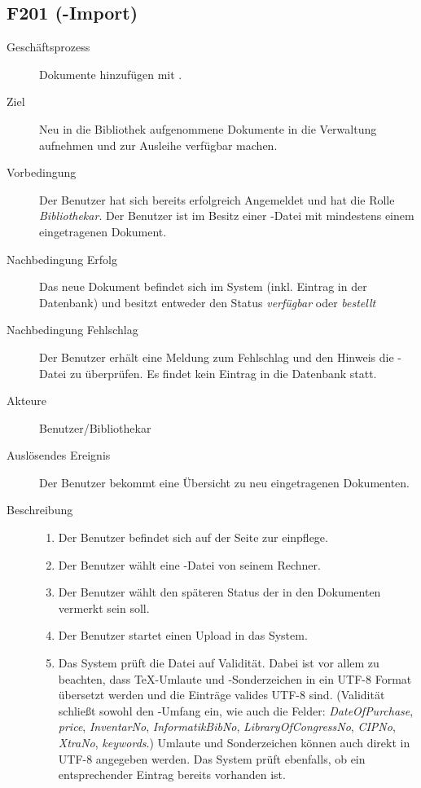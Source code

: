 \subsection{F201 (\BibTeX-Import)}
\begin{description}
  \item[Geschäftsprozess]Dokumente hinzufügen mit \BibTeX.
  \item[Ziel]Neu in die Bibliothek aufgenommene Dokumente in die Verwaltung aufnehmen und zur Ausleihe verfügbar machen.
  \item[Vorbedingung]Der Benutzer hat sich bereits erfolgreich Angemeldet und hat die Rolle \emph{Bibliothekar}. Der Benutzer ist im Besitz einer \BibTeX -Datei mit mindestens einem eingetragenen Dokument.
  \item[Nachbedingung Erfolg]Das neue Dokument befindet sich im System (inkl. Eintrag in der Datenbank) und besitzt entweder den Status \emph{verfügbar} oder \emph{bestellt}
  \item[Nachbedingung Fehlschlag]Der Benutzer erhält eine Meldung zum Fehlschlag und den Hinweis die \BibTeX -Datei zu überprüfen. Es findet kein Eintrag in die Datenbank statt.
  \item[Akteure]Benutzer/Bibliothekar
  \item[Auslösendes Ereignis]Der Benutzer bekommt eine Übersicht zu neu eingetragenen Dokumenten.
  \item[Beschreibung]\hfill
    \begin{enumerate}
      \item Der Benutzer befindet sich auf der Seite zur \BibTeX einpflege.
      \item Der Benutzer wählt eine \BibTeX -Datei von seinem Rechner.
      \item Der Benutzer wählt den späteren Status der in den Dokumenten vermerkt sein soll.
      \item Der Benutzer startet einen Upload in das System.
      \item Das System prüft die Datei auf Validität. Dabei ist vor allem zu beachten, dass \TeX-Umlaute und -Sonderzeichen in ein UTF-8 Format übersetzt werden und die Einträge valides UTF-8 sind.
	(Validität schließt sowohl den \BibTeX -Umfang ein, wie auch die Felder: \emph{DateOfPurchase}, \emph{price}, \emph{InventarNo}, \emph{InformatikBibNo}, \emph{LibraryOfCongressNo}, \emph{CIPNo}, \emph{XtraNo}, \emph{keywords}.) Umlaute und Sonderzeichen können auch direkt in UTF-8 angegeben werden.
	Das System prüft ebenfalls, ob ein entsprechender Eintrag bereits vorhanden ist.

\end{enumerate}
\end{description}
